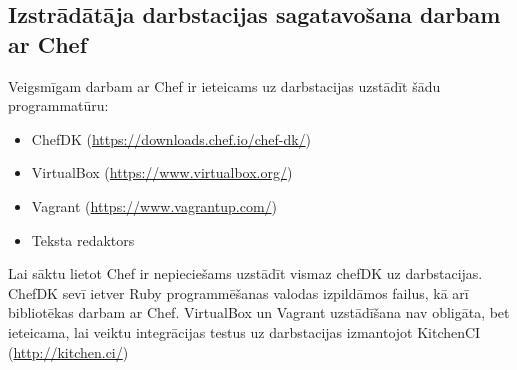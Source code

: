 \subsection{Izstrādātāja darbstacijas sagatavošana darbam ar Chef} \label{ChefDarbstacija}
Veigsmīgam darbam ar Chef ir ieteicams uz darbstacijas uzstādīt šādu programmatūru:
\begin{itemize}
	\item ChefDK (\url{https://downloads.chef.io/chef-dk/})
	\item VirtualBox (\url{https://www.virtualbox.org/})
  \item Vagrant (\url{https://www.vagrantup.com/})
  \item Teksta redaktors
\end{itemize}
Lai sāktu lietot Chef ir nepieciešams uzstādīt vismaz chefDK uz darbstacijas. ChefDK sevī ietver Ruby programmēšanas valodas izpildāmos failus, kā arī bibliotēkas darbam ar Chef.
VirtualBox un Vagrant uzstādīšana nav obligāta, bet ieteicama, lai veiktu integrācijas testus uz darbstacijas izmantojot KitchenCI (\url{http://kitchen.ci/})
%

